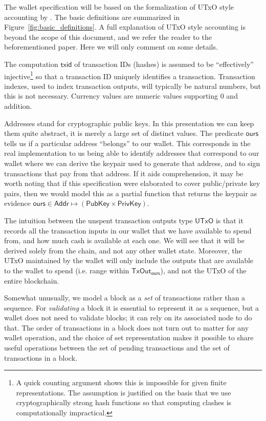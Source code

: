 \documentclass{article}
\begin{document}
The wallet specification will be based on the formalization of UTxO style
accounting by \cite{utxo_accounting}. The basic definitions are summarized in
Figure~\ref{fig:basic_definitions}. A full explanation of UTxO style accounting
is beyond the scope of this document, and we refer the reader to the
beforementioned paper. Here we will only comment on some details.

The computation $\mathsf{txid}$ of transaction IDs (hashes) is assumed to be
``effectively'' injective\footnote{A quick counting argument shows this is
impossible for given finite representations. The assumption is justified on the
basis that we use cryptographically strong hash functions so that computing
clashes is computationally impractical.} so that a transaction ID uniquely
identifies a transaction. Transaction indexes, used to index transaction
outputs, will typically be natural numbers, but this is not necessary. Currency
values are numeric values supporting 0 and addition.

Addresses stand for cryptographic public keys. In this presentation we can keep
them quite abstract, it is merely a large set of distinct values. The predicate
$\mathsf{ours}$ tells us if a particular address ``belongs'' to our wallet.
This corresponds in the real implementation to us being able to identify
addresses that correspond to our wallet where we can derive the keypair used
to generate that address, and to sign transactions that pay from that address.
If it aids comprehension, it may be worth noting that if this specification
were elaborated to cover public/private key pairs, then we would model this as
a partial function that returns the keypair as evidence
$\mathsf{ours} \in \mathsf{Addr} \mapsto (\mathsf{PubKey} \times \mathsf{PrivKey})$.

The intuition between the unspent transaction outputs type $\mathsf{UTxO}$ is
that it records all the transaction inputs in our wallet that we have available
to spend from, and how much cash is available at each one. We will see that it
will be derived solely from the chain, and not any other wallet state. Moreover,
the UTxO maintained by the wallet will only include the outputs that are
available to the wallet to spend (i.e. range within $\mathsf{TxOut_{ours}}$),
and not the UTxO of the entire blockchain.

Somewhat unusually, we model a block as a \emph{set} of transactions rather than
a sequence. For \emph{validating} a block it is essential to represent it as a
sequence, but a wallet does not need to validate blocks; it can rely on its
associated node to do that. The order of transactions in a block does not turn
out to matter for any wallet operation, and the choice of set representation
makes it possible to share useful operations between the set of pending
transactions and the set of transactions in a block.
\end{document}
